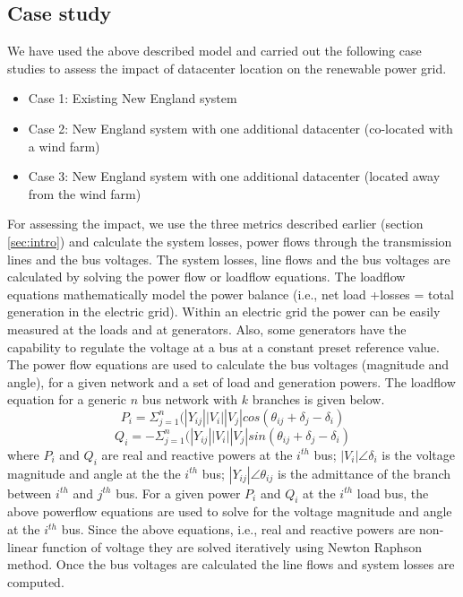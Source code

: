 \subsection{Case study}
We have used the above described model and carried out the following case studies to assess the impact of datacenter location on the renewable power grid.
\begin{itemize}
\item{Case 1: Existing New England system}
\item{Case 2: New England system with one additional datacenter (co-located with a wind farm)}
\item{Case 3: New England system with one additional datacenter (located away from the wind farm)}
\end{itemize}
For assessing the impact, we use the three metrics described earlier (section \ref{sec:intro}) and calculate the system losses, power flows through the transmission lines and the bus voltages.
The system losses, line flows and the bus voltages are calculated by solving the power flow or loadflow equations. The loadflow equations mathematically model the power balance (i.e., net load +losses = total generation in the electric grid). Within an electric grid the power can be easily measured at the loads and at generators. Also, some generators have the capability to regulate the voltage at a bus at a constant preset reference value. The power flow equations are used to calculate the bus voltages (magnitude and angle), for a given network and a set of load and generation powers. The loadflow equation for a generic $n$ bus network with $k$ branches is given below.
\begin{equation}
P_{i} = \Sigma_{j=1}^{n}(|Y_{ij}||V_{i}||V_{j}|cos(\theta_{ij}+\delta_{j}-\delta_{i})
\end{equation}
\begin{equation}
Q_{i} = -\Sigma_{j=1}^{n}(|Y_{ij}||V_{i}||V_{j}|sin(\theta_{ij}+\delta_{j}-\delta_{i})
\end{equation}
where $P_{i}$ and $Q_{i}$ are real and reactive powers at the $i^{th}$ bus; $|V_{i}| \angle \delta_{i}$ is the voltage magnitude and angle at the the $i^{th}$ bus; $|Y_{ij}| \angle \theta_{ij}$ is the admittance of the branch between $i^{th}$ and $j^{th}$ bus.
For a given power $P_{i}$ and $Q_{i}$ at the $i^{th}$ load bus, the above powerflow equations are used to solve for the voltage magnitude and angle at the $i^{th}$ bus. Since the above equations, i.e., real and reactive powers are non-linear function of voltage they are solved iteratively using Newton Raphson method. Once the bus voltages are calculated the line flows and system losses are computed.
